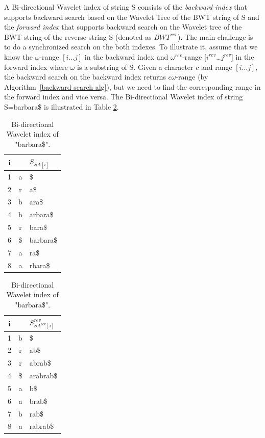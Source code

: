 \documentclass[11pt,a4paper]{report}
\begin{document}
A Bi-directional Wavelet index of string S consists of \cite{bidirectional}
the \emph{backward index} that supports backward search based on the Wavelet Tree of 
the BWT string of S and the \emph{forward index} that supports backward search
on the Wavelet tree of the BWT string of the reverse string S (denoted as 
$BWT^{rev}$). The main challenge is to do a synchronized search on the both indexes.
To illustrate it, assume that we know the $\omega$-range $[i\ldots j]$ in the backward 
index and $\omega^{rev}$-range [$i^{rev}$\ldots $j^{rev}$] in the forward index 
where $\omega$ is a substring of S.
Given a character $c$ and range $[i\ldots j]$, the backward search on the backward 
index returns $c\omega$-range (by Algorithm~\ref{backward search alg}), 
but we need to find the corresponding range in the forward index and vice versa.
The Bi-directional Wavelet index of string S=barbara\$ is 
illustrated in Table \ref{bi-dir_barbara}.

\begin{table}[h]
\parbox{.45\linewidth}{
\centering
\begin{tabular}{ccl}
i& &$S_{SA[i]}$\\
\hline
1 & a & \$ \\
2 & r & a\$ \\
3 & b & ara\$ \\
4 & b & arbara\$ \\
5 & r & bara\$ \\
6 & \$ & barbara\$ \\
7 & a & ra\$ \\
8 & a & rbara\$ 
\end{tabular}
}
\hfill
\parbox{.45\linewidth}{
\centering
\begin{tabular}{ccl}
i&&$S^{rev}_{SA^{rev}[i]}$\\
\hline
1 & b & \$ \\
2 & r & ab\$ \\
3 & r & abrab\$ \\
4 & \$ & arabrab\$ \\
5 & a & b\$ \\
6 & a & brab\$ \\
7 & b & rab\$ \\
8 & a & rabrab\$ 
\end{tabular}
}
\caption{Bi-directional Wavelet index of "barbara\$".}
\label{bi-dir_barbara}

\end{table}
\end{document}
